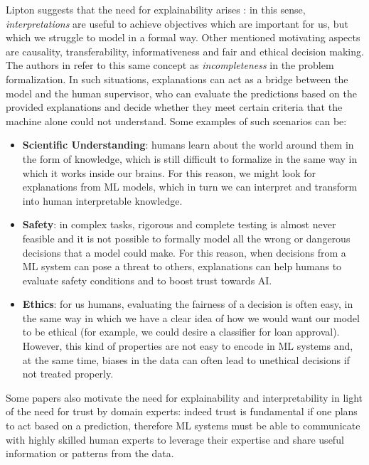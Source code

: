 Lipton \cite{lipton2017mythos} suggests that the need for explainability arises : in this sense, \textit{interpretations} are useful to achieve objectives which are important for us, but which we struggle to model in a formal way. Other mentioned motivating aspects are causality, transferability, informativeness and fair and ethical decision making.
The authors in \cite{doshivelez2017rigorous} refer to this same concept as \textit{incompleteness} in the problem formalization. In such situations, explanations can act as a bridge between the model and the human  supervisor, who can evaluate the predictions based on the provided explanations and decide whether they meet certain criteria that the machine alone could not understand.
 Some examples of such scenarios can be:
\begin{itemize}
	\item \textbf{Scientific Understanding}: humans learn about the world around them in the form of knowledge, which is still difficult to formalize in the same way in which it works inside our brains. For this reason, we might look for explanations from ML models, which in turn we can interpret and transform into human interpretable knowledge.
	\item \textbf{Safety}: in complex tasks, rigorous and complete testing is almost never feasible and it is not possible to formally model all the wrong or dangerous decisions that a model could make. For this reason, when decisions from a ML system can pose a threat to others, explanations can help humans to evaluate safety conditions and to boost trust towards AI.
	\item \textbf{Ethics}: for us humans, evaluating the fairness of a decision is often easy, in the same way in which we have a clear idea of how we would want our model to be ethical (for example, we could desire a  classifier for loan approval). However, this kind of properties are not easy to encode in ML systems and, at the same time, biases in the data can often lead to unethical decisions if not treated properly. 
\end{itemize}

Some papers \cite{Kim2015InteractiveAI, ribeiro2016trust} also motivate the need for explainability and interpretability in light of the need for trust by domain experts: indeed trust is fundamental if one plans to act based on a prediction, therefore ML systems must be able to communicate with highly skilled human experts to leverage their expertise and share useful information or patterns from the data. 

